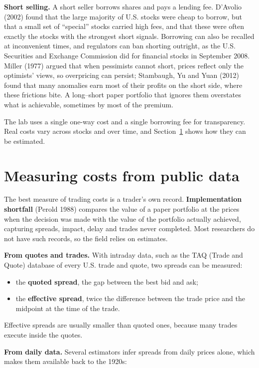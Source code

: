 \textbf{Short selling.} A short seller borrows shares and pays a lending fee. D'Avolio (2002) found that the large majority of U.S. stocks were cheap to borrow, but that a small set of ``special'' stocks carried high fees, and that these were often exactly the stocks with the strongest short signals. Borrowing can also be recalled at inconvenient times, and regulators can ban shorting outright, as the U.S. Securities and Exchange Commission did for financial stocks in September 2008. Miller (1977) argued that when pessimists cannot short, prices reflect only the optimists' views, so overpricing can persist; Stambaugh, Yu and Yuan (2012) found that many anomalies earn most of their profits on the short side, where these frictions bite. A long--short paper portfolio that ignores them overstates what is achievable, sometimes by most of the premium.

The lab uses a single one-way cost and a single borrowing fee for transparency. Real costs vary across stocks and over time, and Section~\ref{sec:06-measuring} shows how they can be estimated.

\section{Measuring costs from public data}
\label{sec:06-measuring}

The best measure of trading costs is a trader's own record. \textbf{Implementation shortfall} (Perold 1988) compares the value of a paper portfolio at the prices when the decision was made with the value of the portfolio actually achieved, capturing spreads, impact, delay and trades never completed. Most researchers do not have such records, so the field relies on estimates.

\textbf{From quotes and trades.} With intraday data, such as the TAQ (Trade and Quote) database of every U.S. trade and quote, two spreads can be measured:

\begin{itemize}
  \item the \textbf{quoted spread}, the gap between the best bid and ask;
  \item the \textbf{effective spread}, twice the difference between the trade price and the midpoint at the time of the trade.
\end{itemize}

Effective spreads are usually smaller than quoted ones, because many trades execute inside the quotes.

\textbf{From daily data.} Several estimators infer spreads from daily prices alone, which makes them available back to the 1920s:


